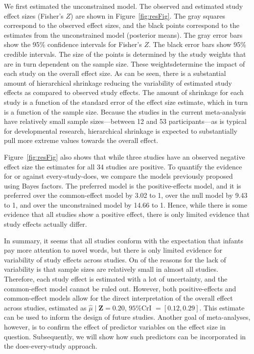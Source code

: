 \documentclass[english,,man]{apa6}
\begin{document}
We first estimated the unconstrained model. The observed and estimated study effect sizes (Fisher's \(Z\)) are shown in Figure~\ref{fig:resFig}. The gray squares correspond to the observed effect sizes, and the black points correspond to the estimates from the unconstrained model (posterior means). The gray error bars show the 95\% confidence intervals for Fisher's \(Z\). The black error bars show 95\% credible intervals. The size of the points is determined by the study weights that are in turn dependent on the sample size. These weightsdetermine the impact of each study on the overall effect size. As can be seen, there is a substantial amount of hierarchical shrinkage reducing the variability of estimated study effects as compared to observed study effects. The amount of shrinkage for each study is a function of the standard error of the effect size estimate, which in turn is a function of the sample size. Because the studies in the current meta-analysis have relatively small sample sizes---between 12 and 53 participants---as is typical for developmental research, hierarchical shrinkage is expected to substantially pull more extreme values towards the overall effect.

Figure~\ref{fig:resFig} also shows that while three studies have an observed negative effect size the estimates for all 34 studies are positive. To quantify the evidence for or against every-study-does, we compare the models previously proposed using Bayes factors. The preferred model is the positive-effects model, and it is preferred over the common-effect model by 3.02 to 1, over the null model by 9.43 to 1, and over the unconstrained model by 14.66 to 1. Hence, while there is some evidence that all studies show a positive effect, there is only limited evidence that study effects actually differ.

In summary, it seems that all studies conform with the expectation that infants pay more attention to novel words, but there is only limited evidence for variability of study effects across studies. On of the reasons for the lack of variability is that sample sizes are relatively small in almost all studies. Therefore, each study effect is estimated with a lot of uncertainty, and the common-effect model cannot be ruled out. However, both positive-effects and common-effect models allow for the direct interpretation of the overall effect across studies, estimated as \(\hat{\mu} \mid \bm Z= 0.20\), \(95\%\)CrI \(= [0.12, 0.29]\). This estimate can be used to inform the design of future studies. Another goal of meta-analyses, however, is to confirm the effect of predictor variables on the effect size in question. Subsequently, we will show how such predictors can be incorporated in the does-every-study approach.
\end{document}
